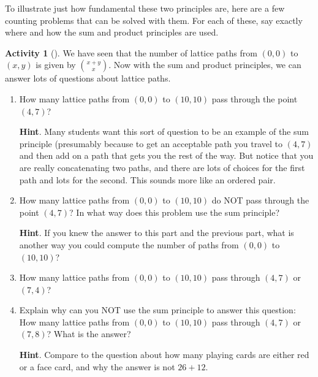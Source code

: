 \documentclass[10pt,]{book}
\theoremstyle{plain}
\theoremstyle{definition}
\theoremstyle{definition}
\theoremstyle{definition}
\newtheorem{activity}[project]{Activity}
\theoremstyle{definition}
\numberwithin{equation}{chapter}
\begin{document}
\hypertarget{p-529}{}%
To illustrate just how fundamental these two principles are, here are a few counting problems that can be solved with them.  For each of these, say exactly where and how the sum and product principles are used.%
\begin{activity}[]\label{activity-28}
\hypertarget{p-530}{}%
We have seen that the number of lattice paths from \((0,0)\) to \((x,y)\) is given by \(\binom{x+y}{x}\).  Now with the sum and product principles, we can answer lots of questions about lattice paths.%
\begin{enumerate}[font=\bfseries,label=(\alph*),ref=\alph*]
\item\label{task-58} \hypertarget{p-531}{}%
How many lattice paths from \((0,0)\) to \((10,10)\) pass through the point \((4,7)\)?%
\par\smallskip%
\noindent\textbf{Hint}.\hypertarget{hint-14}{}\quad%
\hypertarget{p-532}{}%
Many students want this sort of question to be an example of the sum principle (presumably because to get an acceptable path you travel to \((4,7)\) and then add on a path that gets you the rest of the way.  But notice that you are really concatenating two paths, and there are lots of choices for the first path and lots for the second.  This sounds more like an ordered pair.%
\item\label{task-59} \hypertarget{p-533}{}%
How many lattice paths from \((0,0)\) to \((10,10)\) do NOT pass through the point \((4,7)\)?  In what way does this problem use the sum principle?%
\par\smallskip%
\noindent\textbf{Hint}.\hypertarget{hint-15}{}\quad%
\hypertarget{p-534}{}%
If you knew the answer to this part and the previous part, what is another way you could compute the number of paths from \((0,0)\) to \((10,10)\)?%
\item\label{task-60} \hypertarget{p-535}{}%
How many lattice paths from \((0,0)\) to \((10,10)\) pass through \((4,7)\) or \((7,4)\)?%
\item\label{task-61} \hypertarget{p-536}{}%
Explain why can you NOT use the sum principle to answer this question: How many lattice paths from \((0,0)\) to \((10,10)\) pass through \((4,7)\) or \((7,8)\)?  What is the answer?%
\par\smallskip%
\noindent\textbf{Hint}.\hypertarget{hint-16}{}\quad%
\hypertarget{p-537}{}%
Compare to the question about how many playing cards are either red or a face card, and why the answer is not \(26 + 12\).%
\end{enumerate}
\end{activity}
\end{document}
